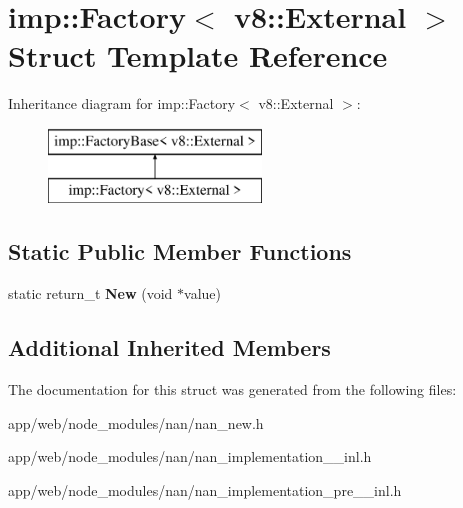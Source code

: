 \hypertarget{structimp_1_1_factory_3_01v8_1_1_external_01_4}{}\section{imp\+:\+:Factory$<$ v8\+:\+:External $>$ Struct Template Reference}
\label{structimp_1_1_factory_3_01v8_1_1_external_01_4}
Inheritance diagram for imp\+:\+:Factory$<$ v8\+:\+:External $>$\+:\begin{figure}[H]
\begin{center}
\leavevmode
\includegraphics[height=2.000000cm]{structimp_1_1_factory_3_01v8_1_1_external_01_4}
\end{center}
\end{figure}
\subsection*{Static Public Member Functions}
\begin{DoxyCompactItemize}
\item 
\mbox{\label{structimp_1_1_factory_3_01v8_1_1_external_01_4_a205243baca98d1339c02d1018d14b1ee}} 
static return\+\_\+t {\bfseries New} (void $\ast$value)
\end{DoxyCompactItemize}
\subsection*{Additional Inherited Members}


The documentation for this struct was generated from the following files\+:\begin{DoxyCompactItemize}
\item 
app/web/node\+\_\+modules/nan/nan\+\_\+new.\+h\item 
app/web/node\+\_\+modules/nan/nan\+\_\+implementation\+\_\+\_\+inl.\+h\item 
app/web/node\+\_\+modules/nan/nan\+\_\+implementation\+\_\+pre\+\_\+\_\+inl.\+h\end{DoxyCompactItemize}
